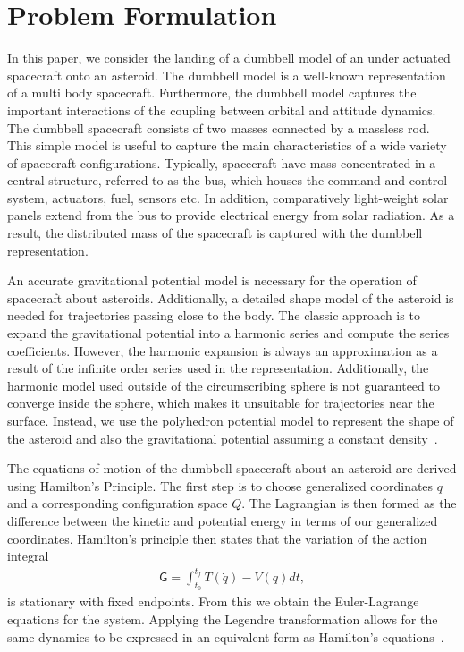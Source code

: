 \documentclass[letterpaper, paper,11pt]{AAS}		%
\begin{document}
\section{Problem Formulation}\label{sec:problem}
In this paper, we consider the landing of a dumbbell model of an under actuated spacecraft onto an asteroid.
The dumbbell model is a well-known representation of a multi body spacecraft.
Furthermore, the dumbbell model captures the important interactions of the coupling between orbital and attitude dynamics. 
The dumbbell spacecraft consists of two masses connected by a massless rod.
This simple model is useful to capture the main characteristics of a wide variety of spacecraft configurations.
Typically, spacecraft have mass concentrated in a central structure, referred to as the bus, which houses the command and control system, actuators, fuel, sensors etc. 
In addition, comparatively light-weight solar panels extend from the bus to provide electrical energy from solar radiation. 
As a result, the distributed mass of the spacecraft is captured with the dumbbell representation.

An accurate gravitational potential model is necessary for the operation of spacecraft about asteroids.
Additionally, a detailed shape model of the asteroid is needed for trajectories passing close to the body.
The classic approach is to expand the gravitational potential into a harmonic series and compute the series coefficients.
However, the harmonic expansion is always an approximation as a result of the infinite order series used in the representation.
Additionally, the harmonic model used outside of the circumscribing sphere is not guaranteed to converge inside the sphere, which makes it unsuitable for trajectories near the surface.
Instead, we use the polyhedron potential model to represent the shape of the asteroid and also the gravitational potential assuming a constant density~\cite{werner1994,werner1997}. 

The equations of motion of the dumbbell spacecraft about an asteroid are derived using Hamilton's Principle. 
The first step is to choose generalized coordinates \( q \) and a corresponding configuration space \( Q \).
The Lagrangian is then formed as the difference between the kinetic and potential energy in terms of our generalized coordinates. 
Hamilton's principle then states that the variation of the action integral
\begin{align}
    \mathsf{G} = \int_{t_0}^{t_f} T(\dot{q}) - V(q) dt,
\end{align}
is stationary with fixed endpoints. 
From this we obtain the Euler-Lagrange equations for the system.
Applying the Legendre transformation allows for the same dynamics to be expressed in an equivalent form as Hamilton's equations~\cite{lanczos1970}.
\end{document}
